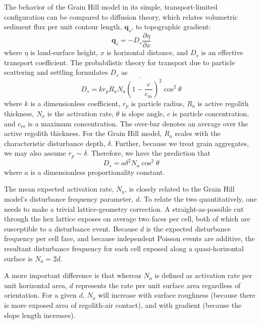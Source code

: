 \documentclass[esurf, manuscript]{copernicus}
\begin{document}
The behavior of the Grain Hill model in its simple, transport-limited configuration can be compared to diffusion theory, which relates volumetric sediment flux per unit contour length, $\mathbf{q}_s$, to topographic gradient:
\begin{equation}
\mathbf{q}_s = -D_s \frac{\partial \eta}{\partial x}
\label{qs}
\end{equation}
where $\eta$ is land-surface height, $x$ is horizontal distance, and $D_s$ is an effective transport coefficient. The \citet{furbish2009statistical} probabilistic theory for transport due to particle scattering and settling formulates $D_s$ as
\begin{equation}
D_s = k r_p R_a \overline{N_a \left( 1 - \frac{c}{c_m}\right)^2} \cos^2 \theta
\end{equation}
where $k$ is a dimensionless coefficient, $r_p$ is particle radius, $R_a$ is active regolith thickness, $N_a$ is the activation rate, $\theta$ is slope angle, $c$ is particle concentration, and $c_m$ is a maximum concentration. The over-bar denotes an average over the active regolith thickness. For the Grain Hill model, $R_a$ scales with the characteristic disturbance depth, $\delta$. Further, because we treat grain aggregates, we may also assume $r_p\sim \delta$. Therefore, we have the prediction that
\begin{equation}
D_s = a \delta^2 N_a \cos^2 \theta
\label{D}
\end{equation}
where $a$ is a dimensionless proportionality constant.  

The mean expected activation rate, $N_a$, is closely related to the Grain Hill model's disturbance frequency parameter, $d$. To relate the two quantitatively, one needs to make a trivial lattice-geometry correction. A straight-as-possible cut through the hex lattice exposes on average two faces per cell, both of which are susceptible to a disturbance event. Because $d$ is the expected disturbance frequency per cell face, and because independent Poisson events are additive, the resultant disturbance frequency for each cell exposed along a quasi-horizontal surface is $N_a = 2d$.

A more important difference is that whereas $N_a$ is defined as activation rate per unit horizontal area, $d$ represents the rate per unit surface area regardless of orientation. For a given $d$, $N_a$ will increase with surface roughness (because there is more exposed area of regolith-air contact), and with gradient (because the slope length increases).
\end{document}

